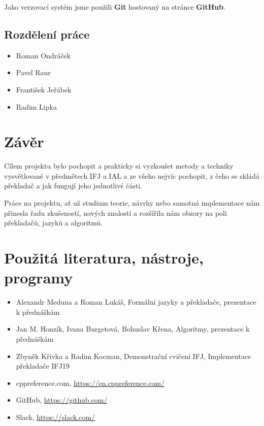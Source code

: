 \documentclass[12pt]{article}
\begin{document}
Jako verzovací systém jsme použili \textbf{Git} hostovaný na stránce \textbf{GitHub}. 
\subsection{Rozdělení práce}
\begin{itemize}
  \item Roman Ondráček
  \item Pavel Raur
  \item František Jeřábek
  \item Radim Lipka
\end{itemize}
\section{Závěr}
Cílem projektu bylo pochopit a prakticky si vyzkoušet metody a techniky vysvětlované v předmětech IFJ a IAL a ze všeho nejvíc pochopit, z čeho se skládá překladač a jak fungují jeho jednotlivé části. 

Práce na projektu, ať už studium teorie, návrhy nebo samotná implementace nám přinesla řadu zkušeností, nových znalostí a rozšířila nám obzory na poli překladačů, jazyků a algoritmů.
\section{Použitá literatura, nástroje, programy}
\begin{itemize}
  \item Alexandr Meduna a Roman Lukáš, Formální jazyky a překladače, prezentace k přednáškám
  \item Jan M. Honzík, Ivana Burgetová, Bohuslav Křena, Algoritmy, prezentace k přednáškám
  \item Zbyněk Křivka a Radim Kocman, Demonstrační cvičení IFJ, Implementace překladače IFJ19 
  \item cppreference.com, \href{https://en.cppreference.com/}{https://en.cppreference.com/}
  \item GitHub, \href{https://github.com/}{https://github.com/}
  \item Slack, \href{https://slack.com/}{https://slack.com/}

\end{itemize}
\end{document}

